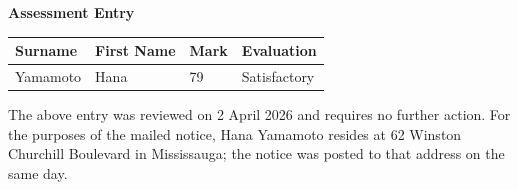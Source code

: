 \documentclass[11pt]{article}
\begin{document}
{\large\bfseries Assessment Entry}

\vspace{1.5em}

\begin{center}
\begin{tabular}{@{}llll@{}}
\toprule
\textbf{Surname} & \textbf{First Name} & \textbf{Mark} & \textbf{Evaluation} \\
\midrule
Yamamoto & Hana & 79 & Satisfactory \\
\bottomrule
\end{tabular}
\end{center}

\vspace{1.5em}

The above entry was reviewed on 2 April 2026 and requires no further action. For
the purposes of the mailed notice, Hana Yamamoto resides at 62 Winston Churchill
Boulevard in Mississauga; the notice was posted to that address on the same day.
\end{document}
